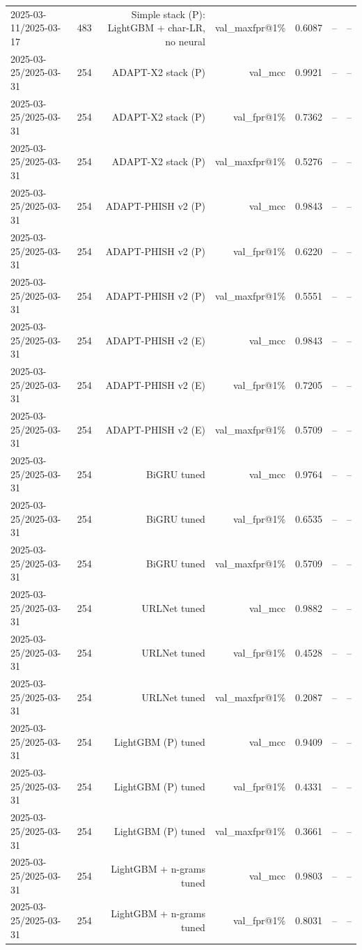 \begin{table}[t]
\begin{tabular}{llrrrrr}
2025-03-11/2025-03-17 & 483 & Simple stack (P): LightGBM + char-LR, no neural & val\_maxfpr@1\% & 0.6087 & -- & -- \\
2025-03-25/2025-03-31 & 254 & ADAPT-X2 stack (P) & val\_mcc & 0.9921 & -- & -- \\
2025-03-25/2025-03-31 & 254 & ADAPT-X2 stack (P) & val\_fpr@1\% & 0.7362 & -- & -- \\
2025-03-25/2025-03-31 & 254 & ADAPT-X2 stack (P) & val\_maxfpr@1\% & 0.5276 & -- & -- \\
2025-03-25/2025-03-31 & 254 & ADAPT-PHISH v2 (P) & val\_mcc & 0.9843 & -- & -- \\
2025-03-25/2025-03-31 & 254 & ADAPT-PHISH v2 (P) & val\_fpr@1\% & 0.6220 & -- & -- \\
2025-03-25/2025-03-31 & 254 & ADAPT-PHISH v2 (P) & val\_maxfpr@1\% & 0.5551 & -- & -- \\
2025-03-25/2025-03-31 & 254 & ADAPT-PHISH v2 (E) & val\_mcc & 0.9843 & -- & -- \\
2025-03-25/2025-03-31 & 254 & ADAPT-PHISH v2 (E) & val\_fpr@1\% & 0.7205 & -- & -- \\
2025-03-25/2025-03-31 & 254 & ADAPT-PHISH v2 (E) & val\_maxfpr@1\% & 0.5709 & -- & -- \\
2025-03-25/2025-03-31 & 254 & BiGRU tuned & val\_mcc & 0.9764 & -- & -- \\
2025-03-25/2025-03-31 & 254 & BiGRU tuned & val\_fpr@1\% & 0.6535 & -- & -- \\
2025-03-25/2025-03-31 & 254 & BiGRU tuned & val\_maxfpr@1\% & 0.5709 & -- & -- \\
2025-03-25/2025-03-31 & 254 & URLNet tuned & val\_mcc & 0.9882 & -- & -- \\
2025-03-25/2025-03-31 & 254 & URLNet tuned & val\_fpr@1\% & 0.4528 & -- & -- \\
2025-03-25/2025-03-31 & 254 & URLNet tuned & val\_maxfpr@1\% & 0.2087 & -- & -- \\
2025-03-25/2025-03-31 & 254 & LightGBM (P) tuned & val\_mcc & 0.9409 & -- & -- \\
2025-03-25/2025-03-31 & 254 & LightGBM (P) tuned & val\_fpr@1\% & 0.4331 & -- & -- \\
2025-03-25/2025-03-31 & 254 & LightGBM (P) tuned & val\_maxfpr@1\% & 0.3661 & -- & -- \\
2025-03-25/2025-03-31 & 254 & LightGBM + n-grams tuned & val\_mcc & 0.9803 & -- & -- \\
2025-03-25/2025-03-31 & 254 & LightGBM + n-grams tuned & val\_fpr@1\% & 0.8031 & -- & -- \\

\end{tabular}
\end{table}
